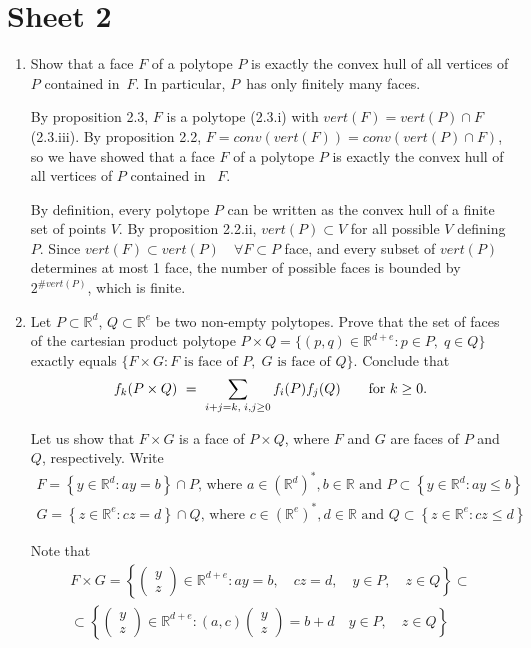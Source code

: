 \documentclass[11pt]{amsart}
\newcommand{\R}{\mathbb{R}}
\theoremstyle{definition}
\begin{document}
\section{Sheet 2}
\begin{enumerate}

\item Show that a face $F$ of a polytope $P$ is exactly the convex hull of all vertices of $P$ contained in~$F$. 
In particular, $P$~has only finitely many faces.

By proposition 2.3, $F$ is a polytope (2.3.i) with $vert(F)=vert(P)\cap F$ (2.3.iii). By proposition 2.2, $F=conv(vert(F))=conv(vert(P)\cap F)$, so we have showed that a face $F$ of a polytope $P$ is exactly the convex hull of all vertices of $P$ contained in ~$F$.

By definition, every polytope $P$ can be written as the convex hull of a finite set of points $V$. By proposition 2.2.ii, $vert(P)\subset V$ for all possible $V$ defining $P$. Since $vert(F)\subset vert(P) \quad\forall F\subset P$ face, and every subset of $vert(P)$ determines at most 1 face, the number of possible faces is bounded by $2^{\#vert(P)}$, which is finite.

\item Let $P\subset\R^d$, $Q\subset\R^e$ be two non-empty polytopes. Prove that the set of faces of the cartesian product polytope $P\times Q=\{(p,q)\in\R^{d+e}:p\in P,\; q\in Q\}$ exactly equals $\{F\times G: F\text{ is face of }P, \;G\text{ is face of }Q\}$. Conclude that
\[
    f_k(P\times Q)
    \ = \
    \sum_{%
      i+j=k,\;i,j\ge0}f_i(P) f_j(Q)
    \qquad
    \text{for } k\ge0.
\]

Let us show that $F\times G$ is a face of $P\times Q$, where $F$ and $G$ are faces of $P$ and $Q$, respectively. Write \[
\begin{array}{c}
 F=\left\{y\in\R^d:ay=b\right\}\cap P\text{, where } a\in(\R^d)^*, b\in\R \text{ and }P\subset\left\{y\in\R^d:ay\leq b\right\}\\
 G=\left\{z\in\R^e:cz=d\right\}\cap Q\text{, where } c\in(\R^e)^*, d\in\R \text{ and }Q\subset\left\{z\in\R^e:cz\leq d\right\}
\end{array}
\]

Note that \[
\begin{split}
F\times G=\left\{\left(\begin{array}{c}
                 y \\ z
                \end{array}
\right)\in\R^{d+e}:ay=b, \quad cz=d, \quad y\in P, \quad z\in Q\right\} \subset \\
\subset \left\{\left(\begin{array}{c}
                 y \\ z
                \end{array}\right)
\in\R^{d+e}:(a,c)
                   \left(\begin{array}{c}
		      y \\ z
		  \end{array}\right)
=b+d \quad y\in P, \quad z\in Q\right\}
\end{split}\]


\end{enumerate}
\end{document}
